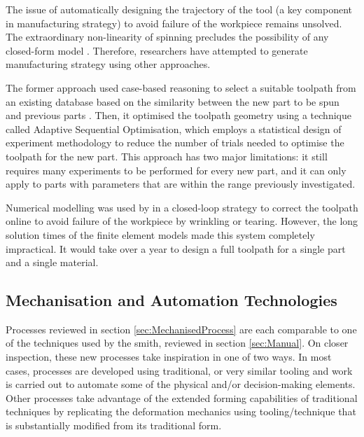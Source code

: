 
The issue of automatically designing the trajectory of the tool (a key component in manufacturing strategy) to avoid failure of the workpiece remains unsolved. The extraordinary non-linearity of spinning precludes the possibility of any closed-form model \citep{Music2010ASpinning}. Therefore, researchers have attempted to generate manufacturing strategy using other approaches.

The former approach used case-based reasoning to select a suitable toolpath from an existing database based on the similarity between the new part to be spun and previous parts \citep{Henkenjohann2005AnProcess}. Then, it optimised the toolpath geometry using a technique called Adaptive Sequential Optimisation, which employs a statistical design of experiment methodology to reduce the number of trials needed to optimise the toolpath for the new part. This approach has two major limitations: it still requires many experiments to be performed for every new part, and it can only apply to parts with parameters that are within the range previously investigated. 

Numerical modelling was used by \citep{Polyblank2015ParametricSpinning} in a closed-loop strategy to correct the toolpath online to avoid failure of the workpiece by wrinkling or tearing. However, the long solution times of the finite element models made this system completely impractical. It would take over a year to design a full toolpath for a single part and a single material. 


 
 
 
\subsection{Mechanisation and Automation Technologies \label{sec:MechandAuto}}

Processes reviewed in section \ref{sec:MechanisedProcess} are each comparable to one of the techniques used by the smith, reviewed in section \ref{sec:Manual}. On closer inspection, these new processes take inspiration in one of two ways. In most cases, processes are developed using traditional, or very similar tooling and work is carried out to automate some of the physical and/or decision-making elements. Other processes take advantage of the extended forming capabilities of traditional techniques by replicating the deformation mechanics using tooling/technique that is substantially modified from its traditional form.

